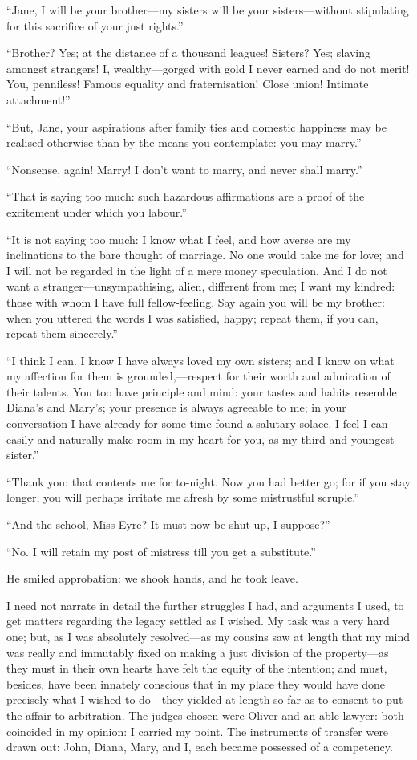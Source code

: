 \enquote{Jane, I will be your brother---my sisters will be your
	sisters---without stipulating for this sacrifice of your just rights.}

\enquote{Brother? Yes; at the distance of a thousand leagues!
	Sisters? Yes; slaving amongst strangers! I, wealthy---gorged with gold
	I never earned and do not merit! You, penniless! Famous equality and
	fraternisation! Close union! Intimate attachment!}

\enquote{But, Jane, your aspirations after family ties and domestic
	happiness may be realised otherwise than by the means you contemplate:
	you may marry.}

\enquote{Nonsense, again! Marry! I don't want to marry, and never
	shall marry.}

\enquote{That is saying too much: such hazardous affirmations are a
	proof of the excitement under which you labour.}

\enquote{It is not saying too much: I know what I feel, and how averse
	are my inclinations to the bare thought of marriage. No one would take
	me for love; and I will not be regarded in the light of a mere money
	speculation. And I do not want a stranger---unsympathising, alien,
	different from me; I want my kindred: those with whom I have full
	fellow-feeling. Say again you will be my brother: when you uttered the
	words I was satisfied, happy; repeat them, if you can, repeat them
	sincerely.}

\enquote{I think I can. I know I have always loved my own sisters; and
	I know on what my affection for them is grounded,---respect for their
	worth and admiration of their talents. You too have principle and mind:
	your tastes and habits resemble Diana's and Mary's; your presence is
	always agreeable to me; in your conversation I have already for some
	time found a salutary solace. I feel I can easily and naturally make
	room in my heart for you, as my third and youngest sister.}

\enquote{Thank you: that contents me for to-night. Now you had better
	go; for if you stay longer, you will perhaps irritate me afresh by some
	mistrustful scruple.}

\enquote{And the school, Miss Eyre? It must now be shut up, I suppose?}

\enquote{No. I will retain my post of mistress till you get a
	substitute.}

He smiled approbation: we shook hands, and he took leave.

I need not narrate in detail the further struggles I had, and arguments
I used, to get matters regarding the legacy settled as I wished. My
task was a very hard one; but, as I was absolutely resolved---as my
cousins saw at length that my mind was really and immutably fixed on
making a just division of the property---as they must in their own
hearts have felt the equity of the intention; and must, besides, have
been innately conscious that in my place they would have done precisely
what I wished to do---they yielded at length so far as to consent to put
the affair to arbitration. The judges chosen were \Mr{} Oliver and an
able lawyer: both coincided in my opinion: I carried my point. The
instruments of transfer were drawn out: \St{} John, Diana, Mary, and I,
each became possessed of a competency.
